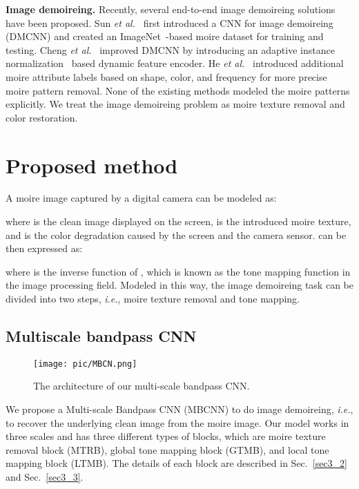\documentclass[10pt,twocolumn,letterpaper]{article}
\begin{document}
\textbf{Image demoireing.} Recently, several end-to-end image demoireing solutions have been proposed. 
Sun \textit{et al.}~\cite{sun2018moire} first introduced a CNN for image demoireing (DMCNN) and created an ImageNet~\cite{russakovsky2015imagenet}-based moire dataset for training and testing. 
Cheng \textit{et al.}~\cite{cheng2019multi} improved DMCNN by introducing an adaptive instance normalization~\cite{adain} based dynamic feature encoder.
He \textit{et al.}~\cite{he2019mop} introduced additional moire attribute labels based on shape, color, and frequency for more precise moire pattern removal.
None of the existing methods modeled the moire patterns explicitly. We treat the image demoireing problem as moire texture removal and color restoration.

\section{Proposed method}

A moire image captured by a digital camera can be modeled as:

where  is the clean image displayed on the screen,  is the introduced moire texture, and  is the color degradation caused by the screen and the camera sensor. 
 can be then expressed as:

where  is the inverse function of , which is known as the tone mapping function in the image processing field. 
Modeled in this way, the image demoireing task can be divided into two steps, \textit{i.e.}, moire texture removal and tone mapping. 


\subsection{Multiscale bandpass CNN}

\begin{figure*}
	\centering
	\texttt{[image: pic/MBCN.png]}
	\caption{The architecture of our multi-scale bandpass CNN.}
	\label{MBCNN}
\end{figure*}

We propose a Multi-scale Bandpass CNN (MBCNN) to do image demoireing, \textit{i.e.}, to recover the underlying clean image from the moire image. 
Our model works in three scales and has three different types of blocks, which are moire texture removal block (MTRB), global tone mapping block (GTMB), and local tone mapping block (LTMB).  
The details of each block are described in Sec.~\ref{sec3_2} and Sec.~\ref{sec3_3}.
\end{document}

